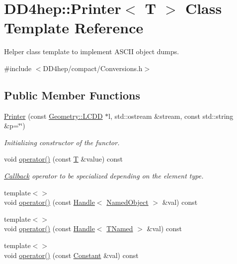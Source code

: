 \hypertarget{struct_d_d4hep_1_1_printer}{
\section{DD4hep::Printer$<$ T $>$ Class Template Reference}
\label{struct_d_d4hep_1_1_printer}
}


Helper class template to implement ASCII object dumps.  


{\ttfamily \#include $<$DD4hep/compact/Conversions.h$>$}\subsection*{Public Member Functions}
\begin{DoxyCompactItemize}
\item 
\hyperlink{struct_d_d4hep_1_1_printer_accc6dac339dc1c219f32c0f2cdef6b70}{Printer} (const \hyperlink{class_d_d4hep_1_1_geometry_1_1_l_c_d_d}{Geometry::LCDD} $\ast$l, std::ostream \&stream, const std::string \&p=\char`\"{}\char`\"{})
\begin{DoxyCompactList}\small\item\em Initializing constructor of the functor. \item\end{DoxyCompactList}\item 
void \hyperlink{struct_d_d4hep_1_1_printer_a8612eda65f4491a0e5d45e235ca09359}{operator()} (const \hyperlink{class_t}{T} \&value) const 
\begin{DoxyCompactList}\small\item\em \hyperlink{class_d_d4hep_1_1_callback}{Callback} operator to be specialized depending on the element type. \item\end{DoxyCompactList}\item 
{\footnotesize template$<$$>$ }\\void \hyperlink{struct_d_d4hep_1_1_printer_afe43814cba7a5a64dc550b7b9be43a81}{operator()} (const \hyperlink{class_d_d4hep_1_1_handle}{Handle}$<$ \hyperlink{class_d_d4hep_1_1_named_object}{NamedObject} $>$ \&val) const
\item 
{\footnotesize template$<$$>$ }\\void \hyperlink{struct_d_d4hep_1_1_printer_aa5a952368672b69afb9dbbc0243798d5}{operator()} (const \hyperlink{class_d_d4hep_1_1_handle}{Handle}$<$ \hyperlink{class_t_named}{TNamed} $>$ \&val) const
\item 
{\footnotesize template$<$$>$ }\\void \hyperlink{struct_d_d4hep_1_1_printer_af17e77692a1780cd7e9b72f8ef93b305}{operator()} (const \hyperlink{class_d_d4hep_1_1_geometry_1_1_constant}{Constant} \&val) const

\end{DoxyCompactItemize}
